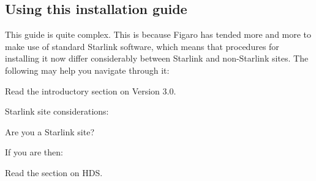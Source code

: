 \subsection{Using this installation guide}

This guide is quite complex. This is because Figaro has tended more and more to
make use of standard Starlink software, which means that procedures for
installing it now differ considerably between Starlink and non-Starlink sites.
The following may help you navigate through it:

Read the introductory section on Version 3.0.

Starlink site considerations:
\begin{description}
	\item Are you a Starlink site?
\end{description}
If you are then:

Read the section on HDS.


